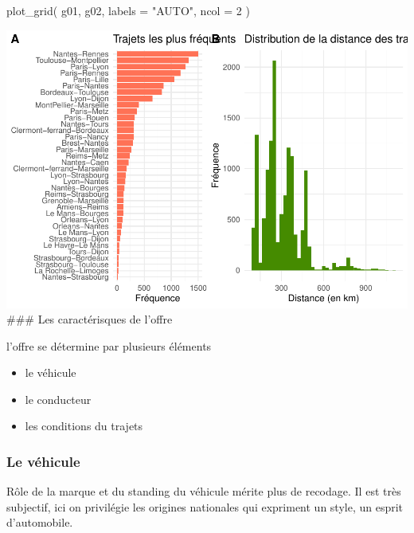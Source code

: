 \documentclass[
]{book}
\newenvironment{Shaded}{\begin{snugshade}}{\end{snugshade}}
\newcommand{\AttributeTok}[1]{\textcolor[rgb]{0.77,0.63,0.00}{#1}}
\newcommand{\DecValTok}[1]{\textcolor[rgb]{0.00,0.00,0.81}{#1}}
\newcommand{\FunctionTok}[1]{\textcolor[rgb]{0.00,0.00,0.00}{#1}}
\newcommand{\NormalTok}[1]{#1}
\newcommand{\StringTok}[1]{\textcolor[rgb]{0.31,0.60,0.02}{#1}}
\providecommand{\tightlist}{%
  \setlength{\itemsep}{0pt}\setlength{\parskip}{0pt}}
\begin{document}
\begin{Shaded}
\begin{Highlighting}[]
\FunctionTok{plot\_grid}\NormalTok{(}
\NormalTok{  g01, g02,}
  \AttributeTok{labels =} \StringTok{"AUTO"}\NormalTok{, }\AttributeTok{ncol =} \DecValTok{2}
\NormalTok{)}
\end{Highlighting}
\end{Shaded}

\includegraphics{bookdown-demo_files/figure-latex/0902-1.pdf}
\#\#\# Les caractérisques de l'offre

l'offre se détermine par plusieurs éléments

\begin{itemize}
\tightlist
\item
  le véhicule
\item
  le conducteur
\item
  les conditions du trajets
\end{itemize}

\hypertarget{le-vuxe9hicule}{%
\subsubsection{Le véhicule}\label{le-vuxe9hicule}}

Rôle de la marque et du standing du véhicule mérite plus de recodage. Il est très subjectif, ici on privilégie les origines nationales qui expriment un style, un esprit d'automobile.
\end{document}
